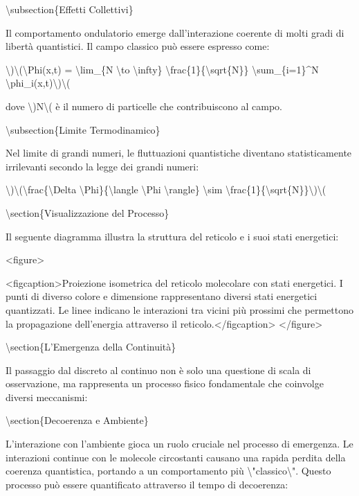 \documentclass[a4paper,11pt]{article}
\begin{document}
\textbackslash{}subsection\{Effetti Collettivi\}

Il comportamento ondulatorio emerge dall'interazione coerente di molti
gradi di libert\`a quantistici. Il campo classico pu\`o essere espresso
come:

\textbackslash{})\textbackslash{}(\textbackslash{}Phi(x,t) = \textbackslash{}lim\_\{N \textbackslash{}to \textbackslash{}infty\} \textbackslash{}frac\{1\}\{\textbackslash{}sqrt\{N\}\} \textbackslash{}sum\_\{i=1\}\textasciicircum{}N \textbackslash{}phi\_i(x,t)\textbackslash{})\textbackslash{}(

dove \textbackslash{})N\textbackslash{}( \`e il numero di particelle che contribuiscono al campo.

\textbackslash{}subsection\{Limite Termodinamico\}

Nel limite di grandi numeri, le fluttuazioni quantistiche diventano
statisticamente irrilevanti secondo la legge dei grandi numeri:

\textbackslash{})\textbackslash{}(\textbackslash{}frac\{\textbackslash{}Delta \textbackslash{}Phi\}\{\textbackslash{}langle \textbackslash{}Phi \textbackslash{}rangle\} \textbackslash{}sim \textbackslash{}frac\{1\}\{\textbackslash{}sqrt\{N\}\}\textbackslash{})\textbackslash{}(

\textbackslash{}section\{Visualizzazione del Processo\}

Il seguente diagramma illustra la struttura del reticolo e i suoi stati
energetici:

<figure>

<figcaption>Proiezione isometrica del reticolo molecolare con stati
energetici. I punti di diverso colore e dimensione rappresentano diversi
stati energetici quantizzati. Le linee indicano le interazioni tra
vicini pi\`u prossimi che permettono la propagazione dell’energia
attraverso il reticolo.</figcaption>
</figure>

\textbackslash{}section\{L'Emergenza della Continuit\`a\}

Il passaggio dal discreto al continuo non \`e solo una questione di scala
di osservazione, ma rappresenta un processo fisico fondamentale che
coinvolge diversi meccanismi:

\textbackslash{}section\{Decoerenza e Ambiente\}

L'interazione con l'ambiente gioca un ruolo cruciale nel processo di
emergenza. Le interazioni continue con le molecole circostanti causano
una rapida perdita della coerenza quantistica, portando a un
comportamento pi\`u \textbackslash{}"classico\textbackslash{}". Questo processo pu\`o essere quantificato
attraverso il tempo di decoerenza:
\end{document}
